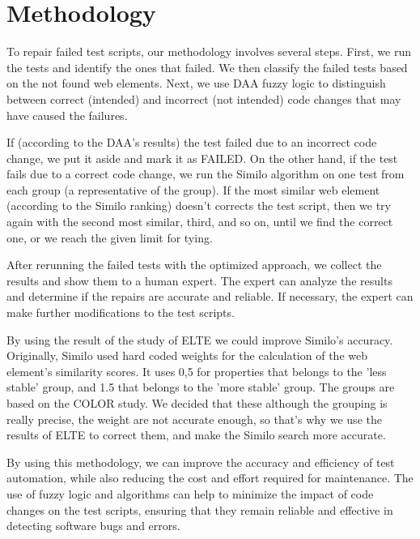 \documentclass{article}
\begin{document}
\maketitle

\section{Methodology}

To repair failed test scripts, our methodology involves several steps. First, we run the tests and identify the ones that failed. We then classify the failed tests based on the not found web elements. Next, we use DAA fuzzy logic\cite{fuzzy_ai_in_web_testing} to distinguish between correct (intended) and incorrect (not intended) code changes that may have caused the failures.

If (according to the DAA's results) the test failed due to an incorrect code change, we put it aside and mark it as FAILED. On the other hand, if the test fails due to a correct code change, we run the Similo\cite{similo} algorithm on one test from each group (a representative of the group). If the most similar web element (according to the Similo\cite{similo} ranking) doesn't corrects the test script, then we try again with the second most similar, third, and so on, until we find the correct one, or we reach the given limit for tying. 

After rerunning the failed tests with the optimized approach, we collect the results and show them to a human expert. The expert can analyze the results and determine if the repairs are accurate and reliable. If necessary, the expert can make further modifications to the test scripts.

By using the result of the study of ELTE\cite{fictional_study} we could improve Similo's accuracy. Originally, Similo\cite{similo} used hard coded weights for the calculation of the web element's similarity scores. It uses 0,5 for properties that belongs to the 'less stable' group, and 1.5 that belongs to the 'more stable' group. The groups are based on the COLOR study\cite{color}. We decided that these although the grouping is really precise, the weight are not accurate enough, so that's why we use the results of ELTE to correct them, and make the Similo search more accurate.

By using this methodology, we can improve the accuracy and efficiency of test automation, while also reducing the cost and effort required for maintenance. The use of fuzzy logic and algorithms can help to minimize the impact of code changes on the test scripts, ensuring that they remain reliable and effective in detecting software bugs and errors.
\end{document}
